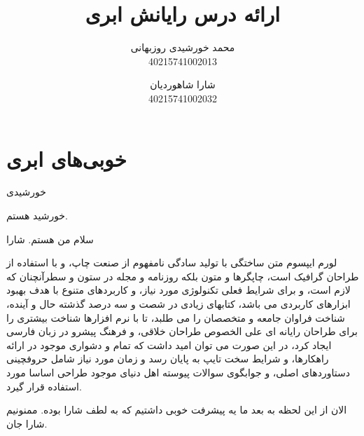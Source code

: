 \documentclass{book}
\title{ارائه درس رایانش ابری}
\author{محمد خورشیدی روزبهانی\\40215741002013 \and شارا شاهوردیان\\40215741002032}
\date{}
\begin{document}
    \maketitle

    \tableofcontents

    \newpage

    \chapter{خوبی‌های ابری}

    خورشیدی

    خورشید هستم.

    سلام من هستم. شارا 

    لورم ایپسوم متن ساختگی با تولید سادگی نامفهوم از صنعت چاپ، و با استفاده از طراحان گرافیک است، چاپگرها و متون بلکه روزنامه و مجله در ستون و سطرآنچنان که لازم است، و برای شرایط فعلی تکنولوژی مورد نیاز، و کاربردهای متنوع با هدف بهبود ابزارهای کاربردی می باشد، کتابهای زیادی در شصت و سه درصد گذشته حال و آینده، شناخت فراوان جامعه و متخصصان را می طلبد، تا با نرم افزارها شناخت بیشتری را برای طراحان رایانه ای علی الخصوص طراحان خلاقی، و فرهنگ پیشرو در زبان فارسی ایجاد کرد، در این صورت می توان امید داشت که تمام و دشواری موجود در ارائه راهکارها، و شرایط سخت تایپ به پایان رسد و زمان مورد نیاز شامل حروفچینی دستاوردهای اصلی، و جوابگوی سوالات پیوسته اهل دنیای موجود طراحی اساسا مورد استفاده قرار گیرد.

    الان از این لحظه به بعد ما یه پیشرفت خوبی داشتیم که به لطف شارا بوده. ممنونیم شارا جان.
\end{document}
